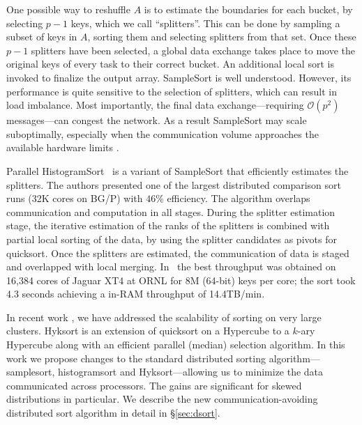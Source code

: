 One possible way to reshuffle $A$ is to estimate the boundaries for each bucket, by selecting $p-1$ keys, which we call
``splitters''. This can be done  by sampling a
subset of keys in $A$, sorting them and selecting splitters from that set. Once these $p-1$ splitters have been
selected, a global data exchange takes place to move the original keys of every task to their correct bucket.
An additional local sort is invoked to finalize the output array. SampleSort is well understood. However, its performance is quite sensitive to the selection of splitters, which can result in load imbalance. Most importantly, the final data exchange---requiring $\mathcal{O}(p^2)$ messages---can congest the network. As a result SampleSort may scale suboptimally, especially when the communication volume approaches the available hardware limits \cite{hyksort}.

Parallel HistogramSort~\cite{kale93,solomonik10} is
a variant of SampleSort that efficiently estimates the splitters. The authors presented
one of the largest distributed comparison sort runs (32K cores on
BG/P) with $46\%$ efficiency. The algorithm overlaps communication
and computation in all stages. During the splitter estimation
stage, the iterative estimation of the ranks of the splitters is
combined with partial local sorting of the data, by using the
splitter candidates as pivots for quicksort. Once the splitters
are estimated, the communication of data is staged and overlapped
with local merging. In~\cite{solomonik10} the best throughput was
obtained on 16,384 cores of Jaguar XT4 at ORNL for 8M (64-bit) keys
per core; the sort took 4.3 seconds achieving a in-RAM throughput of
14.4TB/min. 


In recent work \cite{hyksort}, we have addressed the scalability of sorting on very large clusters. Hyksort\cite{hyksort} is an extension of quicksort on a Hypercube \cite{wagar87} to a $k$-ary Hypercube along with an efficient parallel (median) selection algorithm. In this work we propose changes to the standard distributed sorting algorithm---samplesort, histogramsort and Hyksort---allowing us to minimize the data communicated across processors. The gains are significant for skewed distributions in particular. We describe the new communication-avoiding distributed sort algorithm in detail in \S\ref{sec:dsort}.

